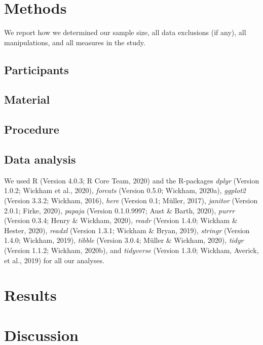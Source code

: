 \documentclass[
  english,
  man]{apa6}
\begin{document}
\hypertarget{methods}{%
\section{Methods}\label{methods}}

We report how we determined our sample size, all data exclusions (if any), all manipulations, and all measures in the study.

\hypertarget{participants}{%
\subsection{Participants}\label{participants}}

\hypertarget{material}{%
\subsection{Material}\label{material}}

\hypertarget{procedure}{%
\subsection{Procedure}\label{procedure}}

\hypertarget{data-analysis}{%
\subsection{Data analysis}\label{data-analysis}}

We used R (Version 4.0.3; R Core Team, 2020) and the R-packages \emph{dplyr} (Version 1.0.2; Wickham et al., 2020), \emph{forcats} (Version 0.5.0; Wickham, 2020a), \emph{ggplot2} (Version 3.3.2; Wickham, 2016), \emph{here} (Version 0.1; Müller, 2017), \emph{janitor} (Version 2.0.1; Firke, 2020), \emph{papaja} (Version 0.1.0.9997; Aust \& Barth, 2020), \emph{purrr} (Version 0.3.4; Henry \& Wickham, 2020), \emph{readr} (Version 1.4.0; Wickham \& Hester, 2020), \emph{readxl} (Version 1.3.1; Wickham \& Bryan, 2019), \emph{stringr} (Version 1.4.0; Wickham, 2019), \emph{tibble} (Version 3.0.4; Müller \& Wickham, 2020), \emph{tidyr} (Version 1.1.2; Wickham, 2020b), and \emph{tidyverse} (Version 1.3.0; Wickham, Averick, et al., 2019) for all our analyses.

\hypertarget{results}{%
\section{Results}\label{results}}

\hypertarget{discussion}{%
\section{Discussion}\label{discussion}}
\end{document}

